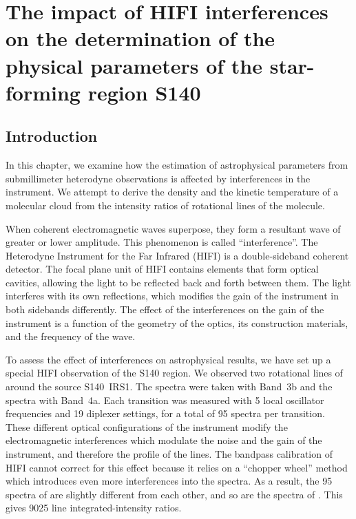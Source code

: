 \cleardoublepage
\chapter{The impact of HIFI interferences on the determination of the physical parameters of the star-forming region S140}
\label{sec:chapter5}

\section{Introduction}

In this chapter, we examine how the estimation of astrophysical parameters from submillimeter heterodyne observations is affected by interferences in the instrument.
We attempt to derive the density and the kinetic temperature of a molecular cloud from the intensity ratios of rotational lines of the  molecule.

When coherent electromagnetic waves superpose, they form a resultant wave of greater or lower amplitude.
This phenomenon is called ``interference''.
The Heterodyne Instrument for the Far Infrared (HIFI) is a double-sideband coherent detector.
The focal plane unit of HIFI contains elements that form optical cavities, allowing the light to be reflected back and forth between them.
The light interferes with its own reflections, which modifies the gain of the instrument in both sidebands differently.
The effect of the interferences on the gain of the instrument is a function of the geometry of the optics, its construction materials, and the frequency of the wave.

To assess the effect of interferences on astrophysical results, we have set up a special HIFI observation of the S140 region.
We observed two rotational lines of~ around the source S140~IRS1.
The  spectra were taken with Band~3b and the  spectra with Band~4a.
Each transition was measured with 5 local oscillator frequencies and 19 diplexer settings, for a total of 95 spectra per transition.
These different optical configurations of the instrument modify the electromagnetic interferences which modulate the noise and the gain of the instrument,
and therefore the profile of the lines.
The bandpass calibration of HIFI cannot correct for this effect because it relies on a ``chopper wheel'' method~\parencite{kutner1981recommendations,ossenkopf2002intensity} which introduces even more interferences into the spectra.
As a result, the 95 spectra of  are slightly different from each other, and so are the spectra of .
This gives 9025 line integrated-intensity ratios.

